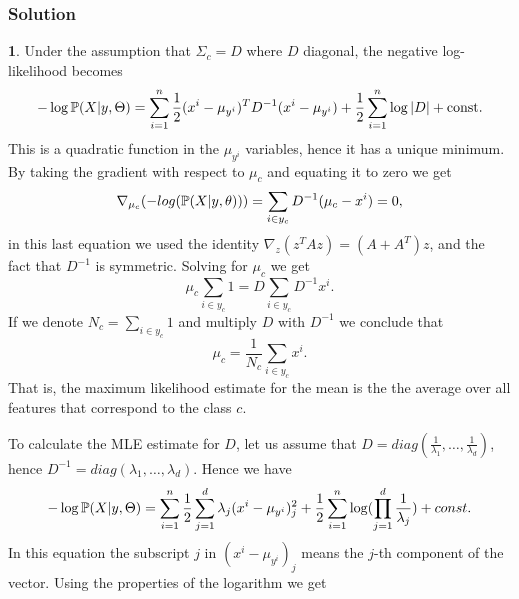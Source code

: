 \documentclass{article}
\begin{document}
\subsubsection*{Solution}
\textbf{1}. Under the assumption that $\Sigma_{c}=D$ where $D$ diagonal, the negative log-likelihood becomes
\begin{equation*}
- \log \mathbb{P}(X|y,\Theta)
 = \sum_{i=1}^n \frac{1}{2}(x^i - \mu_{y^i})^TD^{-1}(x^i - \mu_{y^i}) + \frac 1 2\sum_{i=1}^n \log|D| + \text{const.}
\end{equation*}
This is a quadratic function in the $\mu_{y^{i}}$ variables, hence it has a unique minimum. By taking the gradient with respect to $\mu_{c}$ 
and equating it to zero we get
\begin{equation*}
\nabla_{\mu_{c}}(-log(\mathbb{P}(X|y,\theta)))=\sum_{i\in y_{c}}D^{-1}(\mu_{c}-x^{i})=0,
\end{equation*}
in this last equation we used the identity $\nabla_{z} (z^{T}Az)=(A+A^{T})z$, and the fact that $D^{-1}$ is symmetric.
Solving for $\mu_{c}$ we get
\begin{equation*}
\mu_{c}\sum_{i\in y_{c}}1=D\sum_{i\in y_{c}}D^{-1}x^{i}.
\end{equation*}
If we denote $N_{c}=\sum_{i\in y_{c}}1$ and multiply $D$ with $D^{-1}$  we conclude that
\begin{equation*}
\mu_{c}=\frac{1}{N_{c}}\sum_{i\in y_{c}}x^{i}.
\end{equation*}
That is, the maximum likelihood estimate for the mean is the the average over all features that correspond to the class $c$.

To calculate the MLE estimate for $D$, let us assume that $D=diag(\frac{1}{\lambda_{1}},\ldots,\frac{1}{\lambda_{d}})$, hence
$D^{-1}=diag(\lambda_{1},\ldots,\lambda_{d})$. Hence we have
\begin{equation*}
- \log \mathbb{P}(X|y,\Theta)=\sum_{i=1}^{n} \frac{1}{2}\sum_{j=1}^{d}\lambda_{j}(x^{i}-\mu_{y^{i}})^{2}_{j}+\frac{1}{2}\sum_{i=1}^{n}\log(\prod_{j=1}^{d}\frac{1}{\lambda_{j}})+const.
\end{equation*}
In this equation the subscript $j$ in $(x^{i}-\mu_{y^{i}})_{j}$ means the $j$-th component of the vector. Using the properties of the logarithm we get
\end{document}
